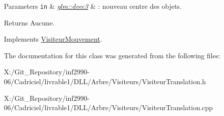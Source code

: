 \begin{DoxyParams}[1]{Parameters}
\mbox{\tt in}  & {\em \hyperlink{group__core__types_ga7f3287f952e6ccb481231368091702ac}{glm\-::dvec3}} & \-: nouveau centre des objets.\\
\hline
\end{DoxyParams}
\begin{DoxyReturn}{Returns}
Aucune. 
\end{DoxyReturn}


Implements \hyperlink{class_visiteur_mouvement}{Visiteur\-Mouvement}.



The documentation for this class was generated from the following files\-:\begin{DoxyCompactItemize}
\item 
X\-:/\-Git\-\_\-\-Repository/inf2990-\/06/\-Cadriciel/livrable1/\-D\-L\-L/\-Arbre/\-Visiteurs/Visiteur\-Translation.\-h\item 
X\-:/\-Git\-\_\-\-Repository/inf2990-\/06/\-Cadriciel/livrable1/\-D\-L\-L/\-Arbre/\-Visiteurs/Visiteur\-Translation.\-cpp\end{DoxyCompactItemize}
